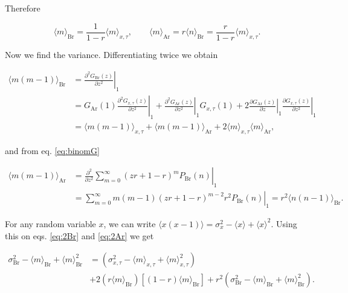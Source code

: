 Therefore

\begin{equation}
  \label{eq:aveBrAr}
  \langle m\rangle_\text{Br} = \frac{1}{1-r}\langle m\rangle_{x,\tau},\quad\quad \langle m\rangle_\text{Ar} = r\langle n\rangle_\text{Br} = \frac{r}{1-r}\langle m\rangle_{x,\tau}.
\end{equation}

Now we find the variance. Differentiating twice we obtain

\begin{equation}
  \label{eq:2Br}
  \begin{split}
    \langle m(m-1)\rangle_\text{Br} &= \left.\frac{\partial^2 G_\text{Br}(z)}{\partial z^2}\right|_1\\
    &=G_\text{Ar}(1)\left.\frac{\partial^2 G_{x,\tau}(z)}{\partial z^2}\right|_1 + \left.\frac{\partial^2 G_\text{Ar}(z)}{\partial z^2}\right|_1G_{x,\tau}(1) + 2\left.\frac{\partial G_\text{Ar}(z)}{\partial z}\right|_1\left.\frac{\partial G_{x,\tau}(z)}{\partial z^2}\right|_1\\
    &=\langle m(m-1)\rangle_{x,\tau}+\langle m(m-1)\rangle_\text{Ar}+2\langle m\rangle_{x,\tau}\langle m\rangle_\text{Ar},
  \end{split}
\end{equation}

and from eq. \eqref{eq:binomG}

\begin{equation}
  \label{eq:2Ar}
  \begin{split}
    \langle m(m-1)\rangle_\text{Ar} &= \left.\frac{\partial^2}{\partial z^2}\sum_{m=0}^\infty(zr+1-r)^mP_\text{Br}(n)\right|_1\\
    &= \left.\sum_{m=0}^\infty m(m-1)(zr+1-r)^{m-2}r^2P_\text{Br}(n)\right|_1 = r^2\langle n(n-1)\rangle_\text{Br}.
  \end{split}
\end{equation}

For any random variable $x$, we can write $\langle x(x-1)\rangle = \sigma_x^2 - \langle x\rangle + \langle x\rangle^2$. Using this on eqs. \eqref{eq:2Br} and \eqref{eq:2Ar} we get

\begin{equation*}
  \begin{split}
  \sigma^2_\text{Br}- \langle m\rangle_\text{Br} + \langle m\rangle^2_\text{Br} &= \left( \sigma^2_{x,\tau} - \langle m\rangle_{x,\tau} + \langle m\rangle_{x,\tau}^2\right)\\
&+ 2\left(r\langle m\rangle_\text{Br}\right)\left[(1-r)\langle m\rangle_\text{Br}\right]+r^2\left(\sigma^2_\text{Br}- \langle m\rangle_\text{Br} + \langle m\rangle^2_\text{Br}\right).
  \end{split}
\end{equation*}

